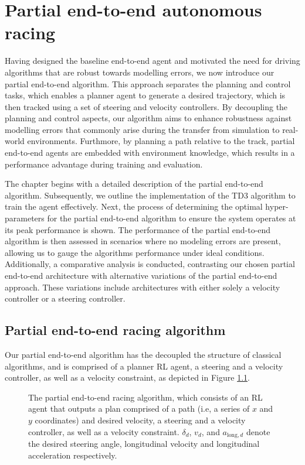 \chapter{Partial end-to-end autonomous racing}
\label{chp:partial_end_to_end_autonomous_racing}

Having designed the baseline end-to-end agent and motivated the need for driving algorithms that are robust towards modelling errors, we now introduce our partial end-to-end algorithm.
This approach separates the planning and control tasks, which enables a planner agent to generate a desired trajectory, which is then tracked using a set of steering and velocity controllers.
By decoupling the planning and control aspects, our algorithm aims to enhance robustness against modelling errors that commonly arise during the transfer from simulation to real-world environments.
Furthmore, by planning a path relative to the track, partial end-to-end agents are embedded with environment knowledge, which results in a performance advantage during training and evaluation.


The chapter begins with a detailed description of the partial end-to-end algorithm.
Subsequently, we outline the implementation of the TD3 algorithm to train the agent effectively.
Next, the process of determining the optimal hyper-parameters for the partial end-to-end algorithm to ensure the system operates at its peak performance is shown. 
The performance of the partial end-to-end algorithm is then assessed in scenarios where no modeling errors are present, allowing us to gauge the algorithms performance under ideal conditions. 
Additionally, a comparative analysis is conducted, contrasting our chosen partial end-to-end architecture with alternative variations of the partial end-to-end approach. 
These variations include architectures with either solely a velocity controller or a steering controller. 



\section{Partial end-to-end racing algorithm}

Our partial end-to-end algorithm has the decoupled the structure of classical algorithms, and is comprised of a planner RL agent, 
a steering and a velocity controller, as well as a velocity constraint, as depicted in Figure \ref{fig:steer_vel_architecture}.

\begin{figure}[htb!]
    \centering
    
    \caption[The partial end-to-end racing algorithm]{The partial end-to-end racing algorithm, which consists of an RL agent that outputs a plan comprised of a path (i.e, a series of $x$ and $y$ coordinates) and desired velocity, a steering and a velocity controller, as well as a velocity constraint. $\delta_{d}$, $v_{d}$, and $a_{\text{long},d}$ denote the desired steering angle, longitudinal velocity and longitudinal acceleration respectively.}
    \label{fig:steer_vel_architecture}
\end{figure}


